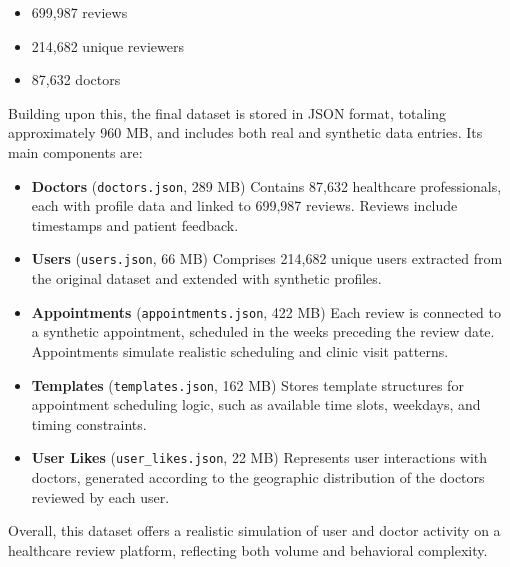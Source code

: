 \begin{itemize}
\item 699,987 reviews
\item 214,682 unique reviewers
\item 87,632 doctors
\end{itemize}

Building upon this, the final dataset is stored in JSON format, totaling approximately 960 MB, and includes both real and synthetic data entries. Its main components are:

\begin{itemize}
\item \textbf{Doctors} (\texttt{doctors.json}, 289 MB)
Contains 87,632 healthcare professionals, each with profile data and linked to 699,987 reviews. Reviews include timestamps and patient feedback.

\item \textbf{Users} (\texttt{users.json}, 66 MB)  
Comprises 214,682 unique users extracted from the original dataset and extended with synthetic profiles.

\item \textbf{Appointments} (\texttt{appointments.json}, 422 MB)  
Each review is connected to a synthetic appointment, scheduled in the weeks preceding the review date. Appointments simulate realistic scheduling and clinic visit patterns.

\item \textbf{Templates} (\texttt{templates.json}, 162 MB)  
Stores template structures for appointment scheduling logic, such as available time slots, weekdays, and timing constraints.

\item \textbf{User Likes} (\texttt{user\_likes.json}, 22 MB)  
Represents user interactions with doctors, generated according to the geographic distribution of the doctors reviewed by each user.

\end{itemize}

Overall, this dataset offers a realistic simulation of user and doctor activity on a healthcare review platform, reflecting both volume and behavioral complexity.
